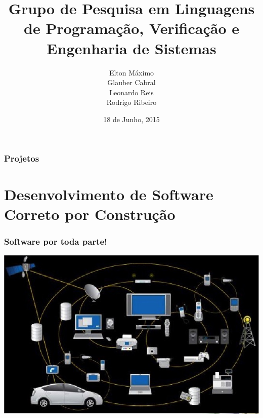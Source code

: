 \documentclass{beamer}
\title[Projetos de Pesquisa]{Grupo de Pesquisa em Linguagens de Programa\c c\~ao, Verifica\c c\~ao e Engenharia de Sistemas}
\author[Lives]{Elton M\'aximo \\ Glauber Cabral \\ Leonardo Reis \\ Rodrigo Ribeiro}
\institute[]{
Departamento de Computa\c c\~ao e Sistemas (DECSI)
}
\date{18 de Junho, 2015}
\newcommand{\putat}[3]{\begin{picture}(0,0)(0,0)\put(#1,#2){#3}\end{picture}}
\begin{document}
\begin{frame}
\titlepage
\end{frame}

\begin{frame}[t]
  \frametitle{Projetos}
  \tableofcontents %
\end{frame}

\section{Desenvolvimento de Software Correto por Construção}

\begin{frame}
 \frametitle{Software por toda parte!}
  \includegraphics[scale=0.5]{img/everywhere}
\end{frame}
\end{document}

